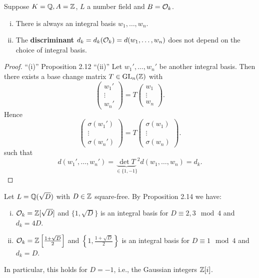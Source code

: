 
\begin{Bem}
	Suppose $K=\mathbb{Q}, A=\mathbb{Z}$, $L$ a number field and $B=\mathcal{O}_k$.
	\begin{enumerate}[(i)]
		\item There is always an integral basis $w_1, \dots, w_n$.
		\item The \textbf{discriminant} $d_k = d_k(\mathcal{O}_k) = d(w_1, \dots, w_n)$ does not depend on the choice of integral basis.
	\end{enumerate}
\end{Bem}

\begin{proof}
	\enquote{(i)} Proposition 2.12
	\enquote{(ii)} Let $w_1', \dots, w_n'$ be another integral basis. Then there exists a base change matrix $T \in \operatorname{GL}_n(\mathbb{Z})$ with
	\[ \begin{pmatrix}
		w_1' \\ \vdots \\ w_n'
	\end{pmatrix}
	= T  \begin{pmatrix}
	w_1 \\ \vdots \\ w_n
	\end{pmatrix}.
	\]
	Hence 
		\[ \begin{pmatrix}
		\sigma(w_1') \\ \vdots \\ \sigma(w_n')
		\end{pmatrix}
		= T  \begin{pmatrix}
		\sigma(w_1) \\ \vdots \\ \sigma(w_n)
		\end{pmatrix}.
		\]
	such that
	\[ d(w_1', \dots, w_n') = {\underbrace{\det T}_{ \in \{ 1, -1\} } }^2 d(w_1, \dots, w_n)
	= d_k.
	\]
\end{proof}

\begin{Bsp}
	Let $L=\mathbb{Q}(\sqrt{D})$ with $D\in\mathbb{Z}$ square-free. By Proposition 2.14 we have:
	\begin{enumerate}[(i)]
		\item $\mathcal{O}_k=\mathbb{Z}[\sqrt{D}]$ and $\{1,\sqrt{D} \}$ is an integral basis for $D \equiv 2,3 \mod 4$ and $d_k = 4D$.
		\item $\mathcal{O}_k=\mathbb{Z}\left[\frac{1+\sqrt{D}}{2}\right]$ and $\left\{1,\frac{1+\sqrt{D}}{2} \right\}$ is an integral basis for $D \equiv 1 \mod 4$ and $d_k = D$.
	\end{enumerate}	
In particular, this holds for $D=-1$, i.e., the Gaussian integers $\mathbb{Z}[i]$.
\end{Bsp}



